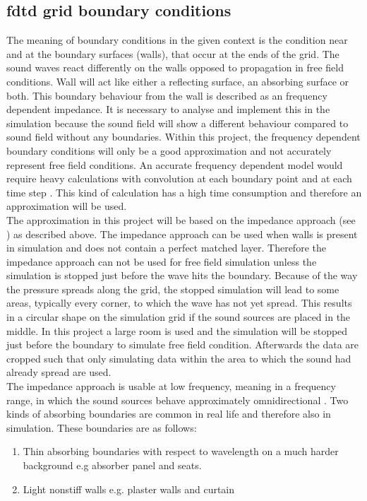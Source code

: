 \subsection{\gls{fdtd} grid boundary conditions}        
The meaning of boundary conditions in the given context is the condition near and at the boundary surfaces (walls), that occur at the ends of the grid. The sound waves react differently on the walls opposed to propagation in free field conditions. Wall will act like either a reflecting surface, an absorbing surface or both. This boundary behaviour from the wall is described as an frequency dependent impedance. It is necessary to analyse and implement this in the simulation because the sound field will show a different behaviour compared to sound field without any boundaries. Within this project, the frequency dependent boundary conditions will only be a good approximation and not accurately represent free field conditions. An accurate frequency dependent model would require heavy calculations with convolution at each boundary point and at each time step \citep{finiteproblems}. This kind of calculation has a high time consumption and therefore an approximation will be used. \\
The approximation in this project will be based on the impedance approach (see \citep{FDTDmodelling}) as described above. The impedance approach can be used when walls is present in simulation and does not contain a perfect matched layer. Therefore the impedance approach can not be used for free field simulation unless the simulation is stopped just before the wave hits the boundary. Because of the way the pressure spreads along the grid, the stopped simulation will lead to some areas, typically every corner, to which the wave has not yet spread. This results in a circular shape on the simulation grid if the sound sources are placed in the middle. In this project a large room is used and the simulation will be stopped just before the boundary to simulate free field condition. Afterwards the data are cropped such that only simulating data within the area to which the sound had already spread are used. \\

The  impedance approach is usable at low frequency, meaning in a frequency range, in which the sound sources behave approximately omnidirectional \citep{FDTDmodelling}. Two kinds of absorbing boundaries are common in real life and therefore also in simulation. These boundaries are as follows:

\begin{enumerate}
\item Thin absorbing boundaries with respect to wavelength on a much harder background e.g absorber panel and seats.
\item Light nonstiff walls e.g. plaster walls and curtain 
\end{enumerate}


